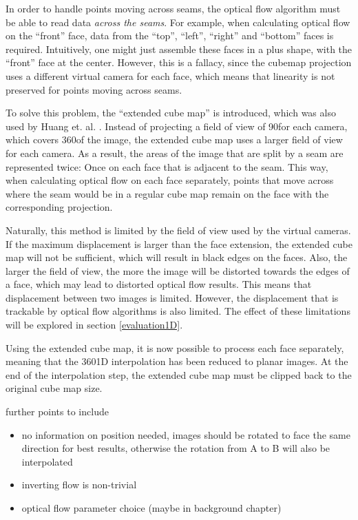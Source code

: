 In order to handle points moving across seams, the optical flow algorithm must be able to read data \emph{across the seams}. For example, when calculating optical flow on the ``front'' face, data from the ``top'', ``left'', ``right'' and ``bottom'' faces is required. Intuitively, one might just assemble these faces in a plus shape, with the ``front'' face at the center. However, this is a fallacy, since the cubemap projection uses a different virtual camera for each face, which means that linearity is not preserved for points moving across seams.


To solve this problem, the ``extended cube map'' is introduced, which was also used by Huang et. al. \cite{6dof}. Instead of projecting a field of view of 90\degree for each camera, which covers 360\degree of the image, the extended cube map uses a larger field of view for each camera. As a result, the areas of the image that are split by a seam are represented twice: Once on each face that is adjacent to the seam. This way, when calculating optical flow on each face separately, points that move across where the seam would be in a regular cube map remain on the face with the corresponding projection. 

Naturally, this method is limited by the field of view used by the virtual cameras. If the maximum displacement is larger than the face extension, the extended cube map will not be sufficient, which will result in black edges on the faces. Also, the larger the field of view, the more the image will be distorted towards the edges of a face, which may lead to distorted optical flow results. This means that displacement between two images is limited. However, the displacement that is trackable by optical flow algorithms is also limited. The effect of these limitations will be explored in section \ref{evaluation1D}.

Using the extended cube map, it is now possible to process each face separately, meaning that the 360\degree 1D interpolation has been reduced to planar images. At the end of the interpolation step, the extended cube map must be clipped back to the original cube map size.

further points to include
\begin{itemize}
\item no information on position needed, images should be rotated to face the same direction for best results, otherwise the rotation from A to B will also be interpolated
\item inverting flow is non-trivial
\item optical flow parameter choice (maybe in background chapter)
\end{itemize}


